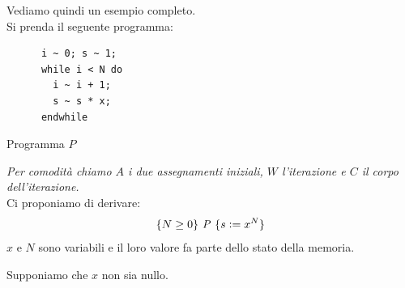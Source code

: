 				      		\begin{esempio}
				      			Vediamo quindi un esempio completo.\\
				      			Si prenda il seguente programma:
				      			\begin{listing}[H]
				      				\begin{lstlisting}
      i ~ 0; s ~ 1;
      while i < N do
        i ~ i + 1;
        s ~ s * x;
      endwhile  
				      				\end{lstlisting}
				      				\caption{Programma $P$}
				      				\label{E:W}
				      			\end{listing}
				      			\textit{Per comodità chiamo $A$ i due assegnamenti iniziali,
				      				$W$ l'iterazione e $C$ il corpo dell'iterazione.}\\
				      			Ci proponiamo di derivare:
				      			\[\{N\geq 0\}\mbox{ \textit{P} }\{s\cceq x^N\}\]
				      			$x$ e $N$ sono variabili e il loro valore fa parte dello stato della memoria.\\
				      			\begin{nota}
				      			Supponiamo che $x$ non sia nullo.
				      			\end{nota}
				      			

\end{esempio}

